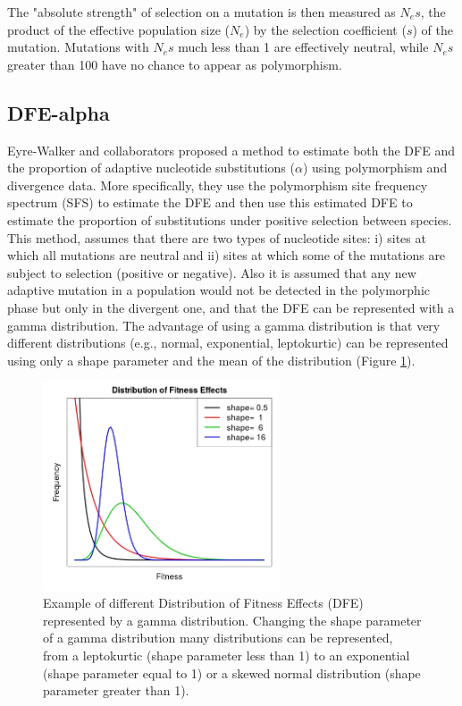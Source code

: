 The "absolute strength" of selection on a mutation is then measured as $N_{e}s$, the product of the effective population size ($N_{e}$)
by the selection coefficient ($s$)
of the mutation. Mutations with $N_{e}s$ much less than 1 are effectively neutral, while $N_{e}s$ greater than 100 have no chance to appear as polymorphism.

\subsection{DFE-alpha}

Eyre-Walker and collaborators 
	\citep{Eyre-Walker2009}
proposed a method to estimate both the DFE and the proportion of adaptive nucleotide substitutions ($\alpha$)
using polymorphism and divergence data.
More specifically, they use the polymorphism site frequency spectrum (SFS) 
to estimate the DFE and then use this estimated DFE to estimate the proportion of substitutions under positive selection between species.
This method, assumes that there are two types of nucleotide sites: 
i) sites at which all mutations are neutral and ii) sites at which some of the mutations are subject to selection (positive or negative).
Also it is assumed that any new adaptive mutation in a population would not be detected in the polymorphic phase but only in the divergent one, 
and that the DFE can be represented with a gamma distribution.
The advantage of using a gamma distribution is that very different distributions (e.g., normal, exponential, leptokurtic) can be represented using only a shape parameter and the mean of the distribution (Figure \ref{fig:Gamma}).

\begin{figure}[h]
  \includegraphics[width=7cm]{./Images/Gamma_dist.jpeg}
  \centering
  \caption{Example of different Distribution of Fitness Effects (DFE) represented by a gamma distribution.
  Changing the shape parameter of a gamma distribution many distributions can be represented, from
  a leptokurtic (shape parameter less than 1) to an exponential (shape parameter equal to 1) or a
  skewed normal distribution (shape parameter greater than 1).
   }
  \label{fig:Gamma}
\end{figure}


